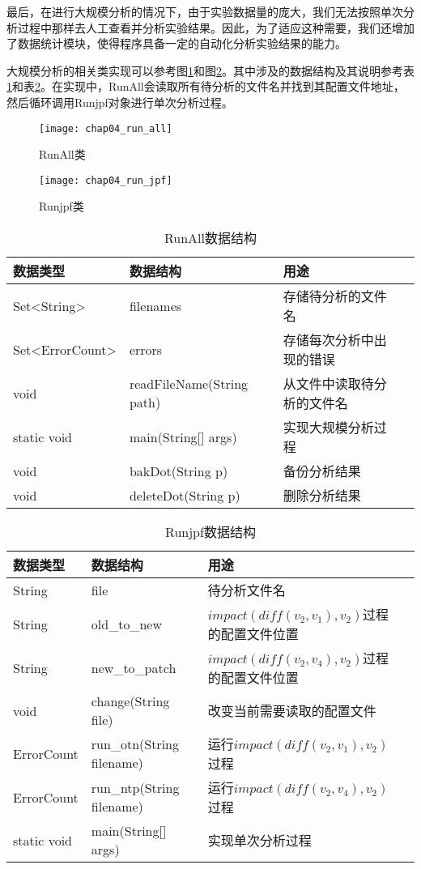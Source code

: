 最后，在进行大规模分析的情况下，由于实验数据量的庞大，我们无法按照单次分析过程中那样去人工查看并分析实验结果。因此，为了适应这种需要，我们还增加了数据统计模块，使得程序具备一定的自动化分析实验结果的能力。

大规模分析的相关类实现可以参考图\ref {class_run_all}和图\ref {class_run_jpf}。其中涉及的数据结构及其说明参考表\ref {run_all_data}和表\ref {run_jpf_data}。在实现中，RunAll会读取所有待分析的文件名并找到其配置文件地址，然后循环调用Runjpf对象进行单次分析过程。

\begin{figure}[H]
	\centering
	\texttt{[image: chap04\_run\_all]}
	\caption {RunAll类}
	\label {class_run_all}	
\end{figure}

\begin{figure}[H]
	\centering
	\texttt{[image: chap04\_run\_jpf]}
	\caption {Runjpf类}
	\label {class_run_jpf}	
\end{figure}

\begin{table}
	\caption{RunAll数据结构}
	\label{run_all_data}
	\centering
	\begin{tabular}{lllc}
		\toprule[1.5pt]
		{\heiti 数据类型} &{\heiti 数据结构} & {\heiti 用途} \\\midrule[1pt]
		Set<String> & filenames & 存储待分析的文件名 \\
		Set<ErrorCount> & errors & 存储每次分析中出现的错误 \\
		void & readFileName(String path) & 从文件中读取待分析的文件名\\
		static void & main(String[] args) & 实现大规模分析过程\\
		void & bakDot(String p) & 备份分析结果\\
		void & deleteDot(String p) & 删除分析结果\\
		\bottomrule[1.5pt]
	\end{tabular}
\end{table}

\begin{table}
	\caption{Runjpf数据结构}
	\label{run_jpf_data}
	\centering
	\begin{tabular}{lllc}
		\toprule[1.5pt]
		{\heiti 数据类型} &{\heiti 数据结构} & {\heiti 用途} \\\midrule[1pt]
		String & file & 待分析文件名\\
		String & old\_to\_new & $impact(diff(v_2,v_1),v_2)$过程的配置文件位置\\
		String & new\_to\_patch & $impact(diff(v_2,v_4),v_2)$过程的配置文件位置\\
		void & change(String file) & 改变当前需要读取的配置文件\\
		ErrorCount & run\_otn(String filename) & 运行$impact(diff(v_2,v_1),v_2)$过程 \\
		ErrorCount & run\_ntp(String filename) & 运行$impact(diff(v_2,v_4),v_2)$过程  \\
		static void & main(String[] args) & 实现单次分析过程\\
		\bottomrule[1.5pt]
	\end{tabular}
\end{table}


